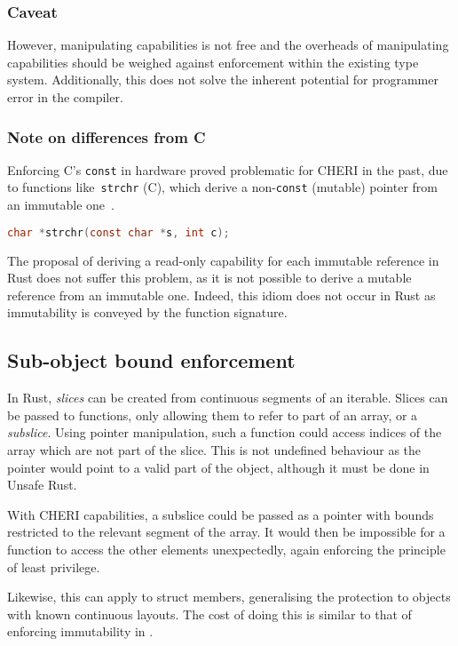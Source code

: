 \documentclass[dissertation.tex]{subfiles}
\begin{document}
\subsubsection{Caveat}
However, manipulating capabilities is not free and the overheads of
manipulating capabilities should be weighed against enforcement within
the existing type system.
Additionally, this does not solve the inherent potential for programmer
error in the compiler.

\subsubsection{Note on differences from C}
Enforcing C's \texttt{const} in hardware proved problematic for CHERI in
the past, due to functions like~\texttt{strchr} (C), which derive a
non-\texttt{const} (mutable) pointer from an immutable
one~\cite{cheri-prog-guide}.

\begin{lstlisting}[language=C]
char *strchr(const char *s, int c);
\end{lstlisting}

The proposal of deriving a read-only capability for each immutable
reference in Rust does not suffer this problem, as it is not possible to
derive a mutable reference from an immutable one.
Indeed, this idiom does not occur in Rust as immutability is conveyed by
the function signature.


\subsection{Sub-object bound enforcement}

In Rust, \emph{slices} can be created from continuous segments of an
iterable.
Slices can be passed to functions, only allowing them to refer to part
of an array, or a \emph{subslice}.
Using pointer manipulation, such a function could access indices of the
array which are not part of the slice.
This is not undefined behaviour as the pointer would point to a valid
part of the object, although it must be done in Unsafe Rust.

With CHERI capabilities, a subslice could be passed as a pointer with
bounds restricted to the relevant segment of the array.
It would then be impossible for a function to access the other elements
unexpectedly, again enforcing the principle of least privilege.

Likewise, this can apply to struct members, generalising the protection
to objects with known continuous layouts.
The cost of doing this is similar to that of enforcing immutability in
.
\end{document}
